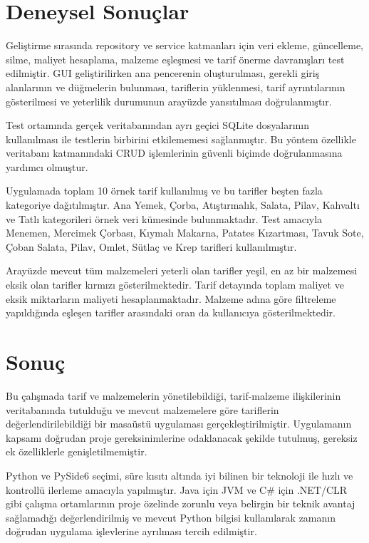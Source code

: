 \documentclass[conference]{IEEEtran}
\begin{document}
\section{Deneysel Sonuçlar}
Geliştirme sırasında repository ve service katmanları için veri ekleme, güncelleme, silme, maliyet hesaplama, malzeme eşleşmesi ve tarif önerme davranışları test edilmiştir. GUI geliştirilirken ana pencerenin oluşturulması, gerekli giriş alanlarının ve düğmelerin bulunması, tariflerin yüklenmesi, tarif ayrıntılarının gösterilmesi ve yeterlilik durumunun arayüzde yansıtılması doğrulanmıştır.

Test ortamında gerçek veritabanından ayrı geçici SQLite dosyalarının kullanılması ile testlerin birbirini etkilememesi sağlanmıştır. Bu yöntem özellikle veritabanı katmanındaki CRUD işlemlerinin güvenli biçimde doğrulanmasına yardımcı olmuştur.

Uygulamada toplam 10 örnek tarif kullanılmış ve bu tarifler beşten fazla kategoriye dağıtılmıştır. Ana Yemek, Çorba, Atıştırmalık, Salata, Pilav, Kahvaltı ve Tatlı kategorileri örnek veri kümesinde bulunmaktadır. Test amacıyla Menemen, Mercimek Çorbası, Kıymalı Makarna, Patates Kızartması, Tavuk Sote, Çoban Salata, Pilav, Omlet, Sütlaç ve Krep tarifleri kullanılmıştır.

Arayüzde mevcut tüm malzemeleri yeterli olan tarifler yeşil, en az bir malzemesi eksik olan tarifler kırmızı gösterilmektedir. Tarif detayında toplam maliyet ve eksik miktarların maliyeti hesaplanmaktadır. Malzeme adına göre filtreleme yapıldığında eşleşen tarifler arasındaki oran da kullanıcıya gösterilmektedir.

\clearpage
\section{Sonuç}
Bu çalışmada tarif ve malzemelerin yönetilebildiği, tarif-malzeme ilişkilerinin veritabanında tutulduğu ve mevcut malzemelere göre tariflerin değerlendirilebildiği bir masaüstü uygulaması gerçekleştirilmiştir. Uygulamanın kapsamı doğrudan proje gereksinimlerine odaklanacak şekilde tutulmuş, gereksiz ek özelliklerle genişletilmemiştir.

Python ve PySide6 seçimi, süre kısıtı altında iyi bilinen bir teknoloji ile hızlı ve kontrollü ilerleme amacıyla yapılmıştır. Java için JVM ve C\# için .NET/CLR gibi çalışma ortamlarının proje özelinde zorunlu veya belirgin bir teknik avantaj sağlamadığı değerlendirilmiş ve mevcut Python bilgisi kullanılarak zamanın doğrudan uygulama işlevlerine ayrılması tercih edilmiştir.
\end{document}
